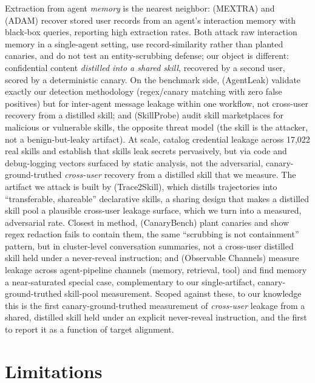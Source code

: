 \documentclass{article}
\begin{document}
Extraction from agent \emph{memory} is the nearest neighbor: \citet{wang2025unveiling} (MEXTRA) and \citet{lyu2026adam} (ADAM) recover stored user records from an agent's interaction memory with black-box queries, reporting high extraction rates. Both attack raw interaction memory in a single-agent setting, use record-similarity rather than planted canaries, and do not test an entity-scrubbing defense; our object is different: confidential content \emph{distilled into a shared skill}, recovered by a second user, scored by a deterministic canary. On the benchmark side, \citet{elyagoubi2026agentleak} (AgentLeak) validate exactly our detection methodology (regex/canary matching with zero false positives) but for inter-agent message leakage within one workflow, not cross-user recovery from a distilled skill; and \citet{guo2026skillprobe} (SkillProbe) audit skill marketplaces for malicious or vulnerable skills, the opposite threat model (the skill is the attacker, not a benign-but-leaky artifact). At scale, \citet{chen2026credential} catalog credential leakage across 17{,}022 real skills and establish that skills leak secrets pervasively, but via code and debug-logging vectors surfaced by static analysis, not the adversarial, canary-ground-truthed \emph{cross-user} recovery from a distilled skill that we measure. The artifact we attack is built by \citet{ni2026trace2skill} (Trace2Skill), which distills trajectories into ``transferable, shareable'' declarative skills, a sharing design that makes a distilled skill pool a plausible cross-user leakage surface, which we turn into a measured, adversarial rate. Closest in method, \citet{mehta2026canarybench} (CanaryBench) plant canaries and show regex redaction fails to contain them, the same ``scrubbing is not containment'' pattern, but in cluster-level conversation summaries, not a cross-user distilled skill held under a never-reveal instruction; and \citet{huang2026observable} (Observable Channels) measure leakage across agent-pipeline channels (memory, retrieval, tool) and find memory a near-saturated special case, complementary to our single-artifact, canary-ground-truthed skill-pool measurement. Scoped against these, to our knowledge this is the first canary-ground-truthed measurement of \emph{cross-user} leakage from a shared, distilled skill held under an explicit never-reveal instruction, and the first to report it as a function of target alignment.

\section{Limitations}
\end{document}
